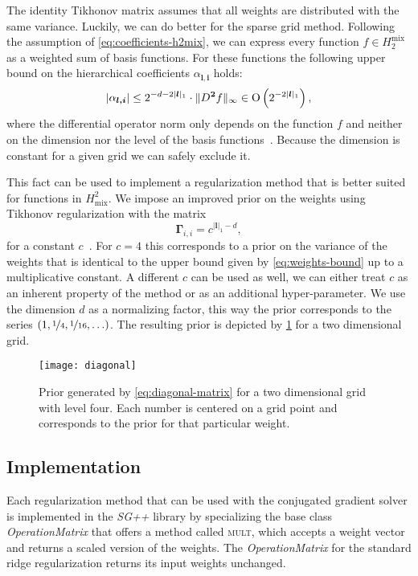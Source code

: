The identity Tikhonov matrix assumes that all weights are distributed with the same variance.
Luckily, we can do better for the sparse grid method.
Following the assumption of \cref{eq:coefficients-h2mix}, we can express every
function \(f \in H_2^{\text{mix}}\) as a weighted sum of basis functions.
For these functions the following upper bound on the hierarchical coefficients \(\alpha_{\bm{l, i}}\) holds:
\begin{equation}\label{eq:weights-bound}
  \vert \alpha_{\bm{l, i}} \vert \leq 2^{-d -2 \vert \bm{l} \vert_1} \cdot \Vert D^{\bm{2}} f \Vert_{\infty} 
                              \in \operatorname{O} \left( 2^{-2 \vert \bm{l} \vert_1} \right),
\end{equation}
where the differential operator norm only depends on the function \(f\) and neither on the dimension nor the level of the basis functions~\cite{bungartzSparse}.
Because the dimension is constant for a given grid we can safely exclude it.

This fact can be used to implement a regularization method that is better suited for functions in \(H^2_\text{mix}\).
We impose an improved prior on the weights using Tikhonov regularization
with the matrix
\begin{equation}\label{eq:diagonal-matrix}
\bm{\Gamma}_{i,i} = c^{\vert \bm{l} \vert_1 - d},
\end{equation}
for a constant \(c\)~\cite{sparse-parsimony}.
For \(c = 4\) this corresponds to a prior on the variance of the weights that is identical to the upper bound given by \cref{eq:weights-bound} up to a multiplicative constant.
A different \(c\) can be used as well, we can either treat \(c\) as an inherent property of the method or as an additional hyper-parameter.
We use the dimension \(d\) as a normalizing factor, this way the prior
corresponds to the series \((1, \nicefrac{1}{4}, \nicefrac{1}{16}, \ldots)\).
The resulting prior is depicted by \cref{fig:diagonal} for a two dimensional grid.

\begin{figure}[htb]
  \centering
  \texttt{[image: diagonal]}
\caption[Diagonal Regularization]{
Prior generated by \cref{eq:diagonal-matrix} for a two dimensional grid with level four.
Each number is centered on a grid point and
corresponds to the prior for that particular weight.
}\label{fig:diagonal}
\end{figure}

\FloatBarrier{}

\subsection{Implementation}
Each regularization method that can be used with the conjugated gradient solver
is implemented in the \emph{SG++} library by specializing the base class
\emph{OperationMatrix} that offers a method called \textsc{mult}, which accepts a weight
vector and returns a scaled version of the weights.
The \emph{OperationMatrix} for the standard ridge regularization returns its input
weights unchanged.

